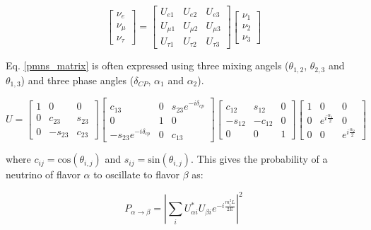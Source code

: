 \begin{equation}\label{pmns_matrix}
\begin{bmatrix} \nu_e \\ \nu_\mu \\ \nu_\tau \end{bmatrix} = \begin{bmatrix} U_{e1} & U_{e2} & U_{e3}\\ U_{\mu 1} & U_{\mu 2} & U_{\mu 3} \\ U_{\tau 1} & U_{\tau 2} & U_{\tau 3} \end{bmatrix} \begin{bmatrix} \nu_1 \\ \nu_2 \\ \nu_3 \end{bmatrix}
\end{equation}

Eq. \ref{pmns_matrix} is often expressed using three mixing angels ($\theta_{1,2}$, $\theta_{2,3}$ and $\theta_{1,3}$) and three phase angles ($\delta_{CP}$, $\alpha_1$ and $\alpha_2$).

\begin{equation}\label{pmns_matrix_expanded}
U = \begin{bmatrix} 1 & 0 & 0\\ 0 & c_{23} & s_{23} \\ 0 & -s_{23} & c_{23} \end{bmatrix} \begin{bmatrix} c_{13} & 0 & s_{23}e^{-i\delta_{cp}}\\ 0 & 1 & 0 \\ -s_{23}e^{-i\delta_{cp}} & 0 & c_{13} \end{bmatrix} \begin{bmatrix} c_{12} & s_{12} & 0\\ -s_{12} & -c_{12} & 0 \\ 0 & 0 & 1 \end{bmatrix} \begin{bmatrix} 1 & 0 & 0\\ 0 & e^{i\frac{\alpha_1}{2}} & 0 \\ 0 & 0 & e^{i\frac{\alpha_2}{2}}\end{bmatrix}
\end{equation}

where $c_{ij}=\mathrm{cos}(\theta_{i,j})$ and $s_{ij}=\mathrm{sin}(\theta_{i,j})$. This gives the probability of a neutrino of flavor $\alpha$ to oscillate to flavor $\beta$ as:

\begin{equation}\label{n_oscillation}
P_{\alpha\rightarrow\beta} = \left|\sum_i U^*_{\alpha i}U_{\beta i} e^{-i\frac{m_i^2L}{2E}}\right|^2
\end{equation}

